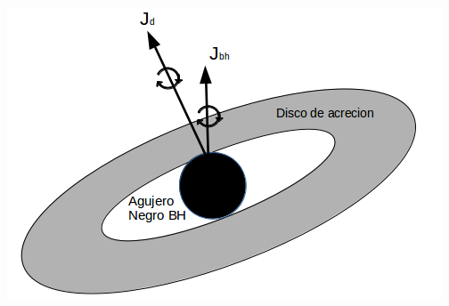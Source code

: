 \begin{center}
\includegraphics[scale=.35]{./figures/4_Modelo_Spin/Modelo_disco_bh.png}
\label{fig: desaliniamineto_bh_disco}
\end{center}

